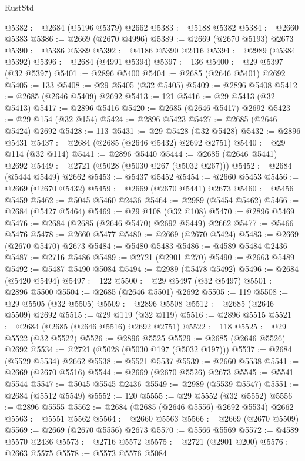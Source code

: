 \begin{lexlean}{RustStd}
\begin{coremodule}
@5382 := @2684 (@5196 @5379) @2662
@5383 := @5188 @5382
@5384 := @2660 @5383
@5386 := @2669 (@2670 @4996)
@5389 := @2669 (@2670 @5193) @2673
@5390 := @5386 @5389
@5392 := @4186 @5390 @2416
@5394 := @2989 (@5384 @5392)
@5396 := @2684 (@4991 @5394)
@5397 := 136
@5400 := @29 @5397 (@32 @5397)
@5401 := @2896 @5400
@5404 := @2685 (@2646 @5401) @2692
@5405 := 133
@5408 := @29 @5405 (@32 @5405)
@5409 := @2896 @5408
@5412 := @2685 (@2646 @5409) @2692
@5413 := 121
@5416 := @29 @5413 (@32 @5413)
@5417 := @2896 @5416
@5420 := @2685 (@2646 @5417) @2692
@5423 := @29 @154 (@32 @154)
@5424 := @2896 @5423
@5427 := @2685 (@2646 @5424) @2692
@5428 := 113
@5431 := @29 @5428 (@32 @5428)
@5432 := @2896 @5431
@5437 := @2684 (@2685 (@2646 @5432) @2692 @2751)
@5440 := @29 @114 (@32 @114)
@5441 := @2896 @5440
@5444 := @2685 (@2646 @5441) @2692
@5449 := @2721 (@5028 (@5030 @267 (@5032 @267)))
@5452 := @2684 (@5444 @5449) @2662
@5453 := @5437 @5452
@5454 := @2660 @5453
@5456 := @2669 (@2670 @5432)
@5459 := @2669 (@2670 @5441) @2673
@5460 := @5456 @5459
@5462 := @5045 @5460 @2436
@5464 := @2989 (@5454 @5462)
@5466 := @2684 (@5427 @5464)
@5469 := @29 @108 (@32 @108)
@5470 := @2896 @5469
@5476 := @2684 (@2685 (@2646 @5470) @2692 @5449) @2662
@5477 := @5466 @5476
@5478 := @2660 @5477
@5480 := @2669 (@2670 @5424)
@5483 := @2669 (@2670 @5470) @2673
@5484 := @5480 @5483
@5486 := @4589 @5484 @2436
@5487 := @2716 @5486
@5489 := @2721 (@2901 @270)
@5490 := @2663 @5489
@5492 := @5487 @5490 @5084
@5494 := @2989 (@5478 @5492)
@5496 := @2684 (@5420 @5494)
@5497 := 122
@5500 := @29 @5497 (@32 @5497)
@5501 := @2896 @5500
@5504 := @2685 (@2646 @5501) @2692
@5505 := 119
@5508 := @29 @5505 (@32 @5505)
@5509 := @2896 @5508
@5512 := @2685 (@2646 @5509) @2692
@5515 := @29 @119 (@32 @119)
@5516 := @2896 @5515
@5521 := @2684 (@2685 (@2646 @5516) @2692 @2751)
@5522 := 118
@5525 := @29 @5522 (@32 @5522)
@5526 := @2896 @5525
@5529 := @2685 (@2646 @5526) @2692
@5534 := @2721 (@5028 (@5030 @197 (@5032 @197)))
@5537 := @2684 (@5529 @5534) @2662
@5538 := @5521 @5537
@5539 := @2660 @5538
@5541 := @2669 (@2670 @5516)
@5544 := @2669 (@2670 @5526) @2673
@5545 := @5541 @5544
@5547 := @5045 @5545 @2436
@5549 := @2989 (@5539 @5547)
@5551 := @2684 (@5512 @5549)
@5552 := 120
@5555 := @29 @5552 (@32 @5552)
@5556 := @2896 @5555
@5562 := @2684 (@2685 (@2646 @5556) @2692 @5534) @2662
@5563 := @5551 @5562
@5564 := @2660 @5563
@5566 := @2669 (@2670 @5509)
@5569 := @2669 (@2670 @5556) @2673
@5570 := @5566 @5569
@5572 := @4589 @5570 @2436
@5573 := @2716 @5572
@5575 := @2721 (@2901 @200)
@5576 := @2663 @5575
@5578 := @5573 @5576 @5084

\end{coremodule}
\end{lexlean}
